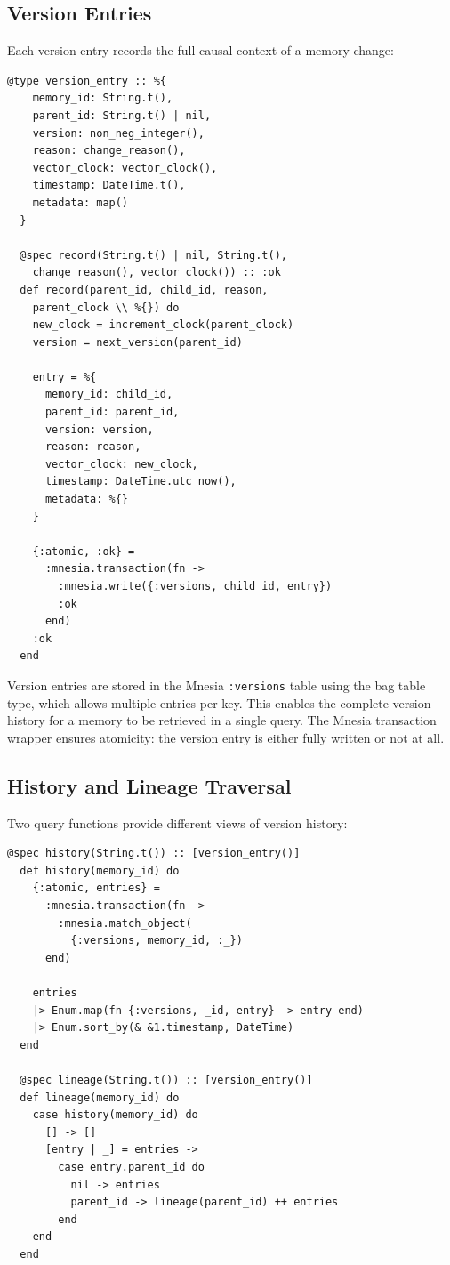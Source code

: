 \documentclass[12pt,a4paper]{article}
\theoremstyle{definition}
\begin{document}
\subsection{Version Entries}\label{subsec:version-entries}

Each version entry records the full causal context of a memory change:

\begin{lstlisting}[caption={Version entry type and recording.}, label={lst:version-entry}]
  @type version_entry :: %{
    memory_id: String.t(),
    parent_id: String.t() | nil,
    version: non_neg_integer(),
    reason: change_reason(),
    vector_clock: vector_clock(),
    timestamp: DateTime.t(),
    metadata: map()
  }

  @spec record(String.t() | nil, String.t(),
    change_reason(), vector_clock()) :: :ok
  def record(parent_id, child_id, reason,
    parent_clock \\ %{}) do
    new_clock = increment_clock(parent_clock)
    version = next_version(parent_id)

    entry = %{
      memory_id: child_id,
      parent_id: parent_id,
      version: version,
      reason: reason,
      vector_clock: new_clock,
      timestamp: DateTime.utc_now(),
      metadata: %{}
    }

    {:atomic, :ok} =
      :mnesia.transaction(fn ->
        :mnesia.write({:versions, child_id, entry})
        :ok
      end)
    :ok
  end
\end{lstlisting}

Version entries are stored in the Mnesia \texttt{:versions} table using the bag table type, which allows multiple entries per key.
This enables the complete version history for a memory to be retrieved in a single query.
The Mnesia transaction wrapper ensures atomicity: the version entry is either fully written or not at all.

\subsection{History and Lineage Traversal}\label{subsec:history}

Two query functions provide different views of version history:

\begin{lstlisting}[caption={Version history and lineage chain traversal.}, label={lst:history}]
  @spec history(String.t()) :: [version_entry()]
  def history(memory_id) do
    {:atomic, entries} =
      :mnesia.transaction(fn ->
        :mnesia.match_object(
          {:versions, memory_id, :_})
      end)

    entries
    |> Enum.map(fn {:versions, _id, entry} -> entry end)
    |> Enum.sort_by(& &1.timestamp, DateTime)
  end

  @spec lineage(String.t()) :: [version_entry()]
  def lineage(memory_id) do
    case history(memory_id) do
      [] -> []
      [entry | _] = entries ->
        case entry.parent_id do
          nil -> entries
          parent_id -> lineage(parent_id) ++ entries
        end
    end
  end
\end{lstlisting}
\end{document}
